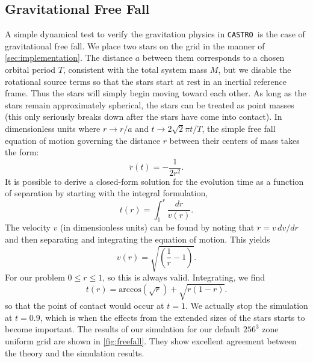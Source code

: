 \documentclass[iop]{../emulateapj}
\newcommand{\castro}{\texttt{CASTRO}}
\begin{document}
\subsection{Gravitational Free Fall}\label{sec:Gravitational Free Fall}

A simple dynamical test to verify the gravitation physics in \castro\ is
the case of gravitational free fall. We place two stars on the grid 
in the manner of \autoref{sec:implementation}. The distance $a$ between 
them corresponds to a chosen orbital period $T$, consistent with the total
system mass $M$, but we disable the rotational source terms so that 
the stars start at rest in an inertial reference frame. 
Thus the stars will simply begin moving toward each other.
As long as the stars remain approximately spherical, the stars can be 
treated as point masses (this only seriously breaks down after the stars
have come into contact). In dimensionless units where $r \to r / a$ and 
$t \to 2\sqrt{2}\pi t / T$, the simple free fall equation of motion governing the
distance $r$ between their centers of mass takes the form:
\begin{equation}
  \ddot{r}(t) = - \frac{1}{2r^2}.
\end{equation}
It is possible to derive a closed-form solution for the evolution time
as a function of separation by starting with the integral formulation,
\begin{equation}
  t(r) = \int_{1}^{r} \frac{dr}{v(r)}.
\end{equation}
The velocity $v$ (in dimensionless units) can be found by noting that 
$\ddot{r} = v\, dv / dr$ and then separating and integrating the equation 
of motion. This yields 
\begin{equation}
  v(r) = \sqrt{\left(\frac{1}{r} - 1\right)}.
\end{equation}
For our problem $0 \leq r \leq 1$, so this is always valid. Integrating, we find
\begin{equation}
  t(r) = \text{arccos}\left(\sqrt{r}\right) + \sqrt{r \left(1 - r\right)}. \label{analyticalFreeFall}
\end{equation}
so that the point of contact would occur at $t = 1$. We actually stop the simulation
at $t = 0.9$, which is when the effects from the extended sizes of the stars
starts to become important. The results of our simulation for our default $256^3$ zone 
uniform grid are shown in \autoref{fig:freefall}. They show excellent agreement
between the theory and the simulation results.
\end{document}
